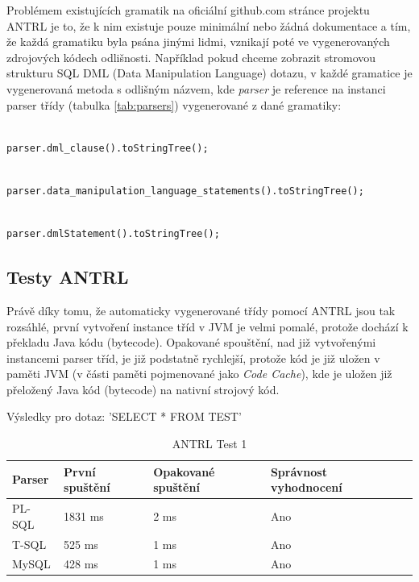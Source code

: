 \documentclass[czech,bachelor,public,dept460,male,cpdeclaration,twoside]{diploma}
\begin{document}
Problémem existujících gramatik na oficiální github.com stránce projektu ANTRL je to, že k nim existuje pouze minimální nebo žádná dokumentace a tím, že každá gramatiku byla psána jinými lidmi, vznikají poté ve vygenerovaných zdrojových kódech odlišnosti. Například pokud chceme zobrazit stromovou strukturu SQL DML (Data Manipulation Language) dotazu, v každé gramatice je vygenerovaná metoda s odlišným názvem, kde \textit{parser} je reference na instanci parser třídy (tabulka \ref{tab:parsers}) vygenerované z dané gramatiky:\newline

\begin{lstlisting}[caption=T-SQL Parser]

parser.dml_clause().toStringTree();
\end{lstlisting}

\begin{lstlisting}[caption=PL-SQL Parser]

parser.data_manipulation_language_statements().toStringTree();
\end{lstlisting}

\begin{lstlisting}[caption=MySQL Parser]

parser.dmlStatement().toStringTree();
\end{lstlisting}

\newpage

\subsection{Testy ANTRL}
Právě díky tomu, že automaticky vygenerované třídy pomocí ANTRL jsou tak rozsáhlé, první vytvoření instance tříd v JVM je velmi pomalé, protože dochází k překladu Java kódu (bytecode). Opakované spouštění, nad již vytvořenými instancemi parser tříd, je již podstatně rychlejší, protože kód je již uložen v paměti JVM (v části paměti pojmenované jako \textit{Code Cache}), kde je uložen již přeložený Java kód (bytecode) na nativní strojový kód.

\begin{table}[!htbp]
	\centering
	\caption{ANTRL Test 1}
	Výsledky pro dotaz: 'SELECT * FROM TEST'
	\vskip 0.1cm
	\label{tab:antrl1}
	\begin{tabular}{lllll}
		\toprule
		Parser & První spuštění & Opakované spuštění & Správnost vyhodnocení\\
		\midrule
		PL-SQL & 1831 ms & 2 ms & Ano \\
        T-SQL & 525 ms & 1 ms & Ano \\
        MySQL & 428 ms & 1 ms & Ano \\
		\midrule
	\end{tabular}
\end{table}
\end{document}
